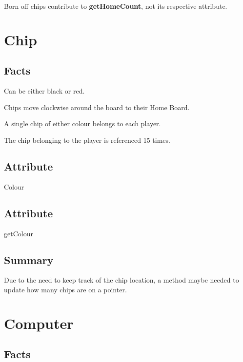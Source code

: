 \documentclass{report}
\begin{document}
\begin{dashed}
    \item Born off chips contribute to \textbf{getHomeCount}, not its respective attribute.
\end{dashed}

\section{Chip}

\subsection{Facts}
\begin{dashed}
    \item Can be either black or red.
    \item Chips move clockwise around the board to their Home Board.
    \item A single chip of either colour belongs to each player.
    \item The chip belonging to the player is referenced 15 times.
\end{dashed}

\subsection{Attribute}
\begin{dashed}
    \item Colour
\end{dashed}

\subsection{Attribute}
\begin{dashed}
    \item getColour
\end{dashed}

\subsection{Summary}
Due to the need to keep track of the chip location, a method maybe needed to update how many chips
are on a pointer.

\section{Computer}

\subsection{Facts}
\end{document}
